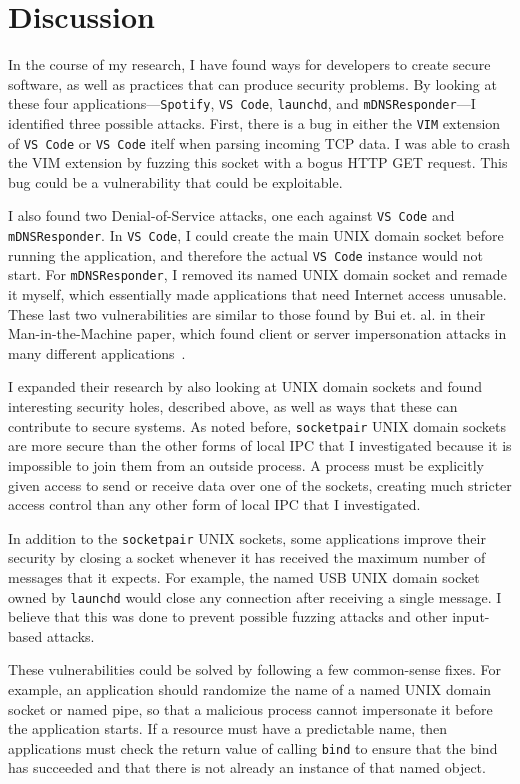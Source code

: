 \chapter{Discussion}
\label{sec:discussion}
In the course of my research, I have found ways for developers to create secure software, as well as practices that can produce security problems.  By looking at these four applications---\texttt{Spotify}, \texttt{VS Code}, \texttt{launchd}, and \texttt{mDNSResponder}---I identified three possible attacks.  First, there is a bug in either the \texttt{VIM} extension of \texttt{VS Code} or \texttt{VS Code} itelf when parsing incoming TCP data.  I was able to crash the VIM extension by fuzzing this socket with a bogus HTTP GET request.  This bug could be a vulnerability that could be exploitable.

I also found two Denial-of-Service attacks, one each against \texttt{VS Code} and \texttt{mDNSResponder}.  In \texttt{VS Code}, I could create the main UNIX domain socket before running the application, and therefore the actual \texttt{VS Code} instance would not start.  For \texttt{mDNSResponder}, I removed its named UNIX domain socket and remade it myself, which essentially made applications that need Internet access unusable.  These last two vulnerabilities are similar to those found by Bui et. al. in their Man-in-the-Machine paper, which found client or server impersonation attacks in many different applications~\cite{MitMa}.

I expanded their research by also looking at UNIX domain sockets and found interesting security holes, described above, as well as ways that these can contribute to secure systems.  As noted before, \texttt{socketpair} UNIX domain sockets are more secure than the other forms of local IPC that I investigated because it is impossible to join them from an outside process.  A process must be explicitly given access to send or receive data over one of the sockets, creating much stricter access control than any other form of local IPC that I investigated.

In addition to the \texttt{socketpair} UNIX sockets, some applications improve their security by closing a socket whenever it has received the maximum number of messages that it expects.  For example, the named USB UNIX domain socket owned by \texttt{launchd} would close any connection after receiving a single message.  I believe that this was done to prevent possible fuzzing attacks and other input-based attacks.

These vulnerabilities could be solved by following a few common-sense fixes.  For example, an application should randomize the name of a named UNIX domain socket or named pipe, so that a malicious process cannot impersonate it before the application starts.  If a resource must have a predictable name, then applications must check the return value of calling \texttt{bind} to ensure that the bind has succeeded and that there is not already an instance of that named object.

